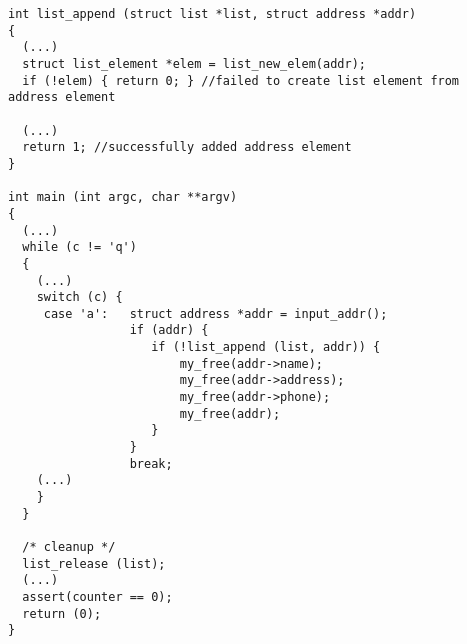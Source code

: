 \begin{lstlisting}
int list_append (struct list *list, struct address *addr)
{
  (...)
  struct list_element *elem = list_new_elem(addr);
  if (!elem) { return 0; } //failed to create list element from address element

  (...)
  return 1; //successfully added address element
}

int main (int argc, char **argv)
{
  (...)
  while (c != 'q')
  {
    (...)
    switch (c) {
     case 'a':   struct address *addr = input_addr();
                 if (addr) {
                    if (!list_append (list, addr)) {
                        my_free(addr->name);
                        my_free(addr->address);
                        my_free(addr->phone);
                        my_free(addr); 
                    }
                 }
                 break; 
    (...)
    }
  }

  /* cleanup */
  list_release (list);
  (...)
  assert(counter == 0);
  return (0);
}
\end{lstlisting}







% 
% 
% 
% 
% 
% 






